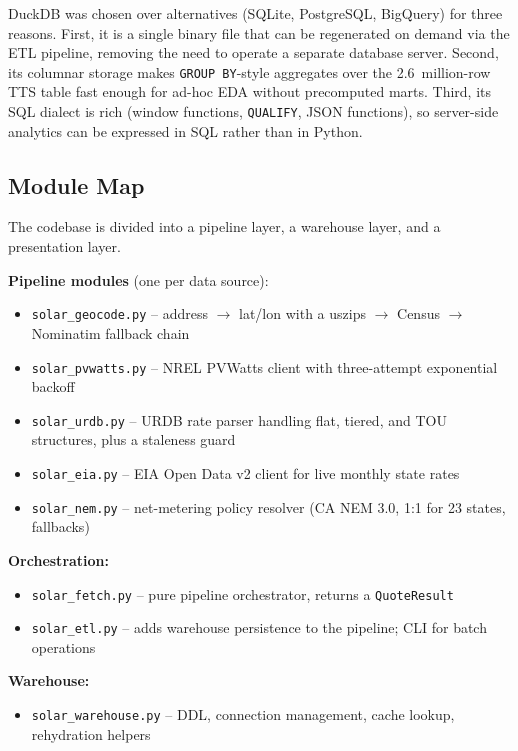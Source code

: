 \documentclass[10pt, conference]{IEEEtran}
\begin{document}
DuckDB was chosen over alternatives (SQLite, PostgreSQL, BigQuery) for three reasons. First, it is a single binary file that can be regenerated on demand via the ETL pipeline, removing the need to operate a separate database server. Second, its columnar storage makes \texttt{GROUP BY}-style aggregates over the 2.6~million-row TTS table fast enough for ad-hoc EDA without precomputed marts. Third, its SQL dialect is rich (window functions, \texttt{QUALIFY}, JSON functions), so server-side analytics can be expressed in SQL rather than in Python.

\subsection{Module Map}

The codebase is divided into a pipeline layer, a warehouse layer, and a presentation layer.

\textbf{Pipeline modules} (one per data source):
\begin{itemize}
\item \texttt{solar\_geocode.py} -- address $\rightarrow$ lat/lon with a uszips $\rightarrow$ Census $\rightarrow$ Nominatim fallback chain
\item \texttt{solar\_pvwatts.py} -- NREL PVWatts client with three-attempt exponential backoff
\item \texttt{solar\_urdb.py} -- URDB rate parser handling flat, tiered, and TOU structures, plus a staleness guard
\item \texttt{solar\_eia.py} -- EIA Open Data v2 client for live monthly state rates
\item \texttt{solar\_nem.py} -- net-metering policy resolver (CA NEM 3.0, 1:1 for 23 states, fallbacks)
\end{itemize}

\textbf{Orchestration:}
\begin{itemize}
\item \texttt{solar\_fetch.py} -- pure pipeline orchestrator, returns a \texttt{QuoteResult}
\item \texttt{solar\_etl.py} -- adds warehouse persistence to the pipeline; CLI for batch operations
\end{itemize}

\textbf{Warehouse:}
\begin{itemize}
\item \texttt{solar\_warehouse.py} -- DDL, connection management, cache lookup, rehydration helpers
\end{itemize}
\end{document}
